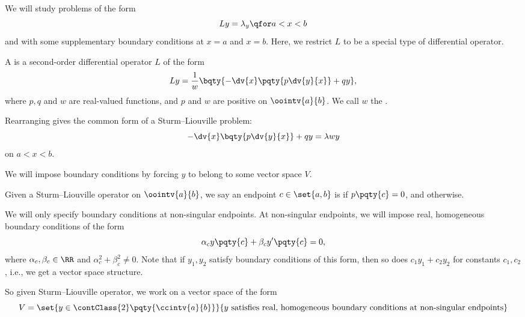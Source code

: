 We will study problems of the form
\begin{equation}
    Ly = \lambda_y \qfor a < x < b
\end{equation}
and with some supplementary boundary conditions at \(x = a\) and \(x = b\). Here, we restrict \(L\) to be a special type of differential operator.

\begin{definition}
    A  is a second-order differential operator \(L\) of the form
    \begin{equation}
        L y = \frac{1}{w} \bqty{- \dv{x}  \pqty{p \dv{y}{x}}  + q y},
    \end{equation}
    where \(p, q\) and \(w\) are real-valued functions, and \(p\) and \(w\) are positive on \(\oointv{a}{b}\). We call \(w\) the .
\end{definition}

Rearranging gives the common form of a Sturm--Liouville problem:
\begin{equation}
    \label{eq:sturm-liouville-problem}%
    - \dv{x} \bqty{p \dv{y}{x}} + qy = \lambda w y
\end{equation}
on \(a < x < b\).

We will impose boundary conditions by forcing \(y\) to belong to some vector space \(V\).

\begin{definition}
    Given a Sturm--Liouville operator on \(\oointv{a}{b}\), we say an endpoint \(c \in \set{a, b}\) is  if \(p\pqty{c} = 0\), and  otherwise.
\end{definition}

We will only specify boundary conditions at non-singular endpoints. At non-singular endpoints, we will impose real, homogeneous boundary conditions of the form
\begin{equation}
    \alpha_c y\pqty{c} + \beta_c y'\pqty{c} = 0,
\end{equation}
where \(\alpha_c, \beta_c \in \RR\) and \(\alpha^2_c + \beta^2_c \neq 0\). Note that if \(y_1, y_2\) satisfy boundary conditions of this form, then so does \(c_1 y_1 + c_2 y_2\) for constants \(c_1, c_2\), i.e., we get a vector space structure.

So given Sturm--Liouville operator, we work on a vector space of the form
\begin{equation}
    V = \set{y \in \contClass{2}\pqty{\ccintv{a}{b}}}{y \text{ satisfies real, homogeneous boundary conditions at non-singular endpoints}}
\end{equation}

